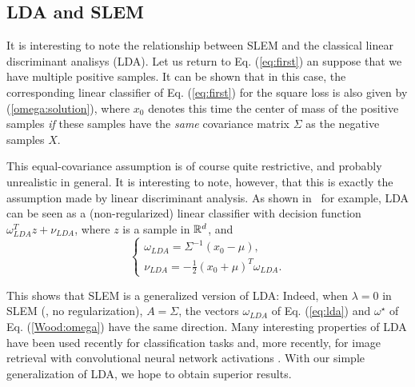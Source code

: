 \subsection{LDA and SLEM}\label{sec:lda}

It is interesting to note the relationship between SLEM and the classical linear discriminant analisys (LDA).
Let us return to Eq. (\ref{eq:first}) an suppose that we have multiple positive samples. It can be shown that in this case, the corresponding linear classifier of Eq. (\ref{eq:first}) for the square loss is also given by
(\ref{omega:solution}), where $x_0$ denotes this time the center of mass
of the positive samples {\em if} these samples have the {\em same} covariance matrix $\Sigma$ as the negative samples $X$.
 
This equal-covariance assumption is of course quite restrictive, and probably unrealistic in general. It is interesting to note, however, that this is exactly the assumption made by linear discriminant analysis. As shown in~\cite{Hastie2009} for example, LDA can be seen as a (non-regularized) linear classifier with decision function $\omega^T_{LDA} z+ \nu_{LDA}$, where $z$ is a sample in
$\mathbb R^d$, and
\begin{equation}
\left\{\begin{array}{l}
\displaystyle \omega_{LDA}=\Sigma^{-1}(x_0-\mu),\\
\displaystyle \nu_{LDA}=-\frac{1}{2}(x_0+\mu)^T \omega_{LDA}.
\end{array}\right.
\label{eq:lda}
\end{equation}
 
This shows that SLEM is a generalized version of LDA: Indeed, when $\lambda=0$ in SLEM (\ie, no regularization), $A = \Sigma$, the vectors $\omega_{LDA}$ of Eq. (\ref{eq:lda}) and $\omega^\star$ of Eq. (\ref{Wood:omega}) have the same direction.
Many interesting properties of LDA have been used recently for classification tasks \cite{GMPD12,HMR12} and, more recently, for image retrieval with convolutional neural network activations \cite{babenko15}.
With our simple generalization of LDA, we hope to obtain superior results.



